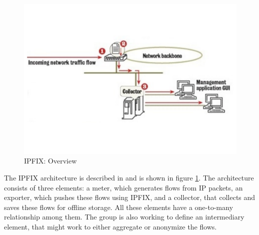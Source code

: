 \begin{figure}[h!]
\begin{center}
  \includegraphics* [width=0.8\linewidth]{figures/ipfix-overview}	
  \caption{IPFIX: Overview \cite{pkohler:2003}}
  \label{fig:ipfix-overview}
\end{center}
\end{figure}
The \ac{IPFIX} architecture is described in \cite{rfc5470} and is shown in figure \ref{fig:ipfix-overview}. The architecture consists of three elements: a meter, which generates flows from \ac{IP} packets, an exporter, which pushes these flows using \ac{IPFIX}, and  a collector, that collects and saves these flows for offline storage. All these elements have a one-to-many relationship among them. The group is also working to define an intermediary element, that might work to either aggregate or anonymize the flows. 


